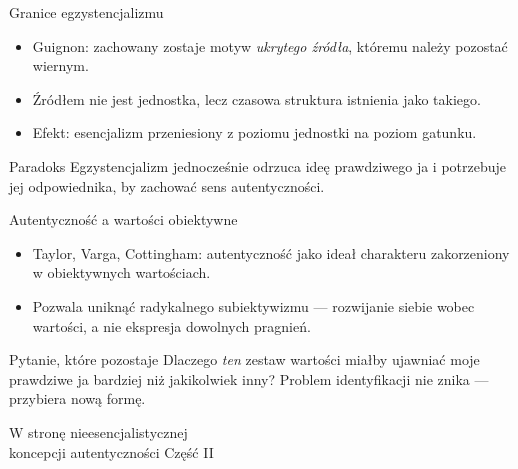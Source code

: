 \documentclass{beamer}
\begin{document}
\begin{frame}{Granice egzystencjalizmu}
  \begin{itemize}
    \item Guignon: zachowany zostaje motyw \emph{ukrytego źródła}, któremu należy
          pozostać wiernym.
    \item Źródłem nie jest jednostka, lecz czasowa struktura istnienia jako takiego.
    \item Efekt: esencjalizm przeniesiony z poziomu jednostki na poziom gatunku.
  \end{itemize}
  \vspace{0.5em}
  \begin{block}{Paradoks}
    Egzystencjalizm jednocześnie odrzuca ideę prawdziwego ja
    i potrzebuje jej odpowiednika, by zachować sens autentyczności.
  \end{block}
\end{frame}
 
\begin{frame}{Autentyczność a wartości obiektywne}
  \begin{itemize}
    \item Taylor, Varga, Cottingham: autentyczność jako ideał charakteru
          zakorzeniony w obiektywnych wartościach.
    \item Pozwala uniknąć radykalnego subiektywizmu --- rozwijanie siebie
          wobec wartości, a nie ekspresja dowolnych pragnień.
  \end{itemize}
  \vspace{0.5em}
  \begin{block}{Pytanie, które pozostaje}
    Dlaczego \emph{ten} zestaw wartości miałby ujawniać moje prawdziwe ja
    bardziej niż jakikolwiek inny? Problem identyfikacji nie znika ---
    przybiera nową formę.
  \end{block}
\end{frame}
 
 
\begin{frame}
  \centering
  \vfill
  {\Huge W stronę nieesencjalistycznej\\[0.3em] koncepcji autentyczności}
  \vfill
  {\large Część II}
  \vfill
\end{frame}
 
\end{document}

